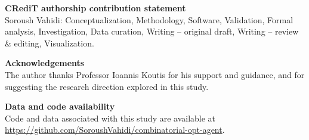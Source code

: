 \documentclass[preprint,12pt]{elsarticle}
\begin{document}
\begin{titlepage}
\vspace{0.6cm}

\noindent\textbf{CRediT authorship contribution statement}\\
Soroush Vahidi: Conceptualization, Methodology, Software, Validation, Formal analysis, Investigation, Data curation, Writing -- original draft, Writing -- review \& editing, Visualization.

\vspace{0.6cm}

\noindent\textbf{Acknowledgements}\\
The author thanks Professor Ioannis Koutis for his support and guidance, and for suggesting the research direction explored in this study.

\vspace{0.6cm}

\noindent\textbf{Data and code availability}\\
Code and data associated with this study are available at \url{https://github.com/SoroushVahidi/combinatorial-opt-agent}.

\end{titlepage}
\end{document}
